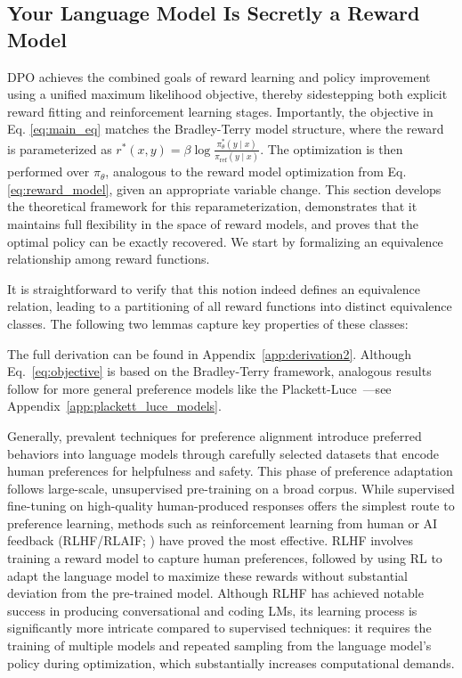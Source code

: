 \subsection{Your Language Model Is Secretly a Reward Model} DPO achieves the combined goals of reward learning and policy improvement using a unified maximum likelihood objective, thereby sidestepping both explicit reward fitting and reinforcement learning stages. Importantly, the objective in Eq. \ref{eq:main_eq} matches the Bradley-Terry model structure, where the reward is parameterized as $r^*(x, y) = \beta \log\frac{\pi^*_\theta(y \mid x)}{\pi_\text{ref}(y \mid x)}$. The optimization is then performed over $\pi_\theta$, analogous to the reward model optimization from Eq. \ref{eq:reward_model}, given an appropriate variable change. This section develops the theoretical framework for this reparameterization, demonstrates that it maintains full flexibility in the space of reward models, and proves that the optimal policy can be exactly recovered. We start by formalizing an equivalence relationship among reward functions.

It is straightforward to verify that this notion indeed defines an equivalence relation, leading to a partitioning of all reward functions into distinct equivalence classes. The following two lemmas capture key properties of these classes:

The full derivation can be found in Appendix~\ref{app:derivation2}. Although Eq.~\ref{eq:objective} is based on the Bradley-Terry framework, analogous results follow for more general preference models like the Plackett-Luce~\citep{plackett1975analysis, luce2012individual}—see Appendix~\ref{app:plackett_luce_models}.

Generally, prevalent techniques for preference alignment introduce preferred behaviors into language models through carefully selected datasets that encode human preferences for helpfulness and safety. This phase of preference adaptation follows large-scale, unsupervised pre-training on a broad corpus. While supervised fine-tuning on high-quality human-produced responses offers the simplest route to preference learning, methods such as reinforcement learning from human or AI feedback (RLHF/RLAIF; \citep{christiano2017deep,bai2022constitutional}) have proved the most effective. RLHF involves training a reward model to capture human preferences, followed by using RL to adapt the language model to maximize these rewards without substantial deviation from the pre-trained model. Although RLHF has achieved notable success in producing conversational and coding LMs, its learning process is significantly more intricate compared to supervised techniques: it requires the training of multiple models and repeated sampling from the language model’s policy during optimization, which substantially increases computational demands.

